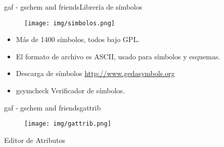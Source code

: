 \message{ !name(alternativa.tex)}\documentclass{beamer}
\begin{document}
\begin{frame}{gaf - gschem and friends}{Librería de símbolos}
  \begin{figure}[!h]
    \centering
    \texttt{[image: img/simbolos.png]}
  \end{figure}
  \begin{itemize}
  \item Más de 1400 símbolos, todos bajo GPL.
  \item El formato de archivo es ASCII, usado para símbolos y esquemas.
  \item Descarga de símbolos \url{http://www.gedasymbols.org}
  \item \alert{gsymcheck} Verificador de símbolos.
  \end{itemize}
\end{frame}

\begin{frame}{gaf - gschem and friends}{gattrib}
  \begin{figure}[!h]
    \centering
    \texttt{[image: img/gattrib.png]}
  \end{figure}
  Editor de Atributos
\end{frame}


\end{document}
